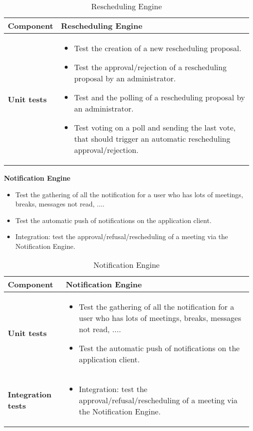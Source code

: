 \begin{table}[H]	
	\centering
	\def\arraystretch{1.5}
	\begin{tabular}{|m{4cm}|m{12cm}|}
		\hline
		\textbf{Component} & Rescheduling Engine \\ \hline
		\textbf{Unit tests} & 
			\begin{itemize}
			\item Test the creation of a new rescheduling proposal.
			\item Test the approval/rejection of a rescheduling proposal by an administrator.
			\item Test and the polling of a rescheduling proposal by an administrator.
			\item Test voting on a poll and sending the last vote, that should trigger an automatic rescheduling approval/rejection.
			\end{itemize} \\ \hline
	\end{tabular}
	\caption{Rescheduling Engine}
\end{table}

\textbf{Notification Engine}

\begin{itemize}
\item Test the gathering of all the notification for a user who has lots of meetings, breaks, messages not read, ....
\item Test the automatic push of notifications on the application client.
\item Integration: test the approval/refusal/rescheduling of a meeting via the Notification Engine.
\end{itemize}

\begin{table}[H]	
	\centering
	\def\arraystretch{1.5}
	\begin{tabular}{|m{4cm}|m{12cm}|}
		\hline
		\textbf{Component} & Notification Engine \\ \hline
		\textbf{Unit tests} & 
			\begin{itemize}
			\item Test the gathering of all the notification for a user who has lots of meetings, breaks, messages not read, ....
			\item Test the automatic push of notifications on the application client.
			\end{itemize} \\ \hline
		\textbf{Integration tests} & 
			\begin{itemize}
			\item Integration: test the approval/refusal/rescheduling of a meeting via the Notification Engine. 
			\end{itemize} \\ \hline
	\end{tabular}
	\caption{Notification Engine}
\end{table}